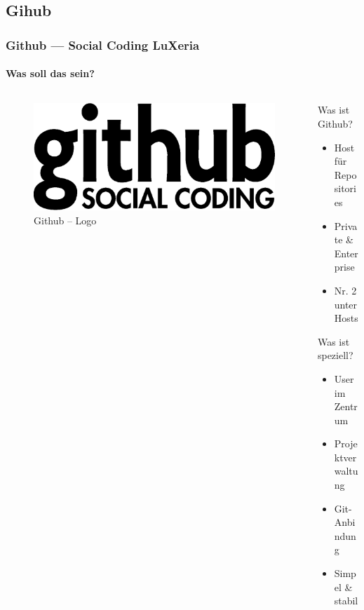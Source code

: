 \subsection{Gihub}
\begin{frame}
	\frametitle{Github --- Social Coding \hfill{} LuXeria}
	\framesubtitle{Was soll das sein?}
	\begin{columns}
		\begin{column}{5cm}
			\begin{figure}
				\includegraphics[scale=0.25]{github_logo.eps}
				\caption{Github -- Logo}
			\end{figure}
		\end{column}
		\begin{column}{5cm}
			\begin{block}{Was ist Github?}
				\begin{itemize}
					\item Host für Repositories
					\item Private \& Enterprise
					\item Nr. 2 unter Hosts
				\end{itemize}
			\end{block}
			\begin{block}{Was ist speziell?}
				\begin{itemize}
					\item User im Zentrum
					\item Projektverwaltung
					\item Git-Anbindung
					\item Simpel \& stabil
				\end{itemize}
			\end{block}
		\end{column}
	\end{columns}
\end{frame}

